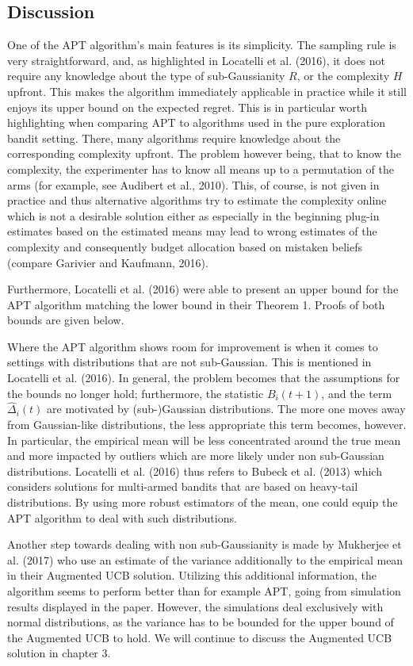 \documentclass[12pt,]{article}
\begin{document}
\subsection{Discussion}\label{discussion}

One of the APT algorithm's main features is its simplicity. The sampling
rule is very straightforward, and, as highlighted in Locatelli et al.
(2016), it does not require any knowledge about the type of
sub-Gaussianity \(R\), or the complexity \(H\) upfront. This makes the
algorithm immediately applicable in practice while it still enjoys its
upper bound on the expected regret. This is in particular worth
highlighting when comparing APT to algorithms used in the pure
exploration bandit setting. There, many algorithms require knowledge
about the corresponding complexity upfront. The problem however being,
that to know the complexity, the experimenter has to know all means up
to a permutation of the arms (for example, see Audibert et al., 2010).
This, of course, is not given in practice and thus alternative
algorithms try to estimate the complexity online which is not a
desirable solution either as especially in the beginning plug-in
estimates based on the estimated means may lead to wrong estimates of
the complexity and consequently budget allocation based on mistaken
beliefs (compare Garivier and Kaufmann, 2016).

Furthermore, Locatelli et al. (2016) were able to present an upper bound
for the APT algorithm matching the lower bound in their Theorem 1.
Proofs of both bounds are given below.

Where the APT algorithm shows room for improvement is when it comes to
settings with distributions that are not sub-Gaussian. This is mentioned
in Locatelli et al. (2016). In general, the problem becomes that the
assumptions for the bounds no longer hold; furthermore, the statistic
\(B_i(t+1)\), and the term \(\hat{\Delta}_i(t)\) are motivated by
(sub-)Gaussian distributions. The more one moves away from Gaussian-like
distributions, the less appropriate this term becomes, however. In
particular, the empirical mean will be less concentrated around the true
mean and more impacted by outliers which are more likely under non
sub-Gaussian distributions. Locatelli et al. (2016) thus refers to
Bubeck et al. (2013) which considers solutions for multi-armed bandits
that are based on heavy-tail distributions. By using more robust
estimators of the mean, one could equip the APT algorithm to deal with
such distributions.

Another step towards dealing with non sub-Gaussianity is made by
Mukherjee et al. (2017) who use an estimate of the variance additionally
to the empirical mean in their Augmented UCB solution. Utilizing this
additional information, the algorithm seems to perform better than for
example APT, going from simulation results displayed in the paper.
However, the simulations deal exclusively with normal distributions, as
the variance has to be bounded for the upper bound of the Augmented UCB
to hold. We will continue to discuss the Augmented UCB solution in
chapter 3.
\end{document}
